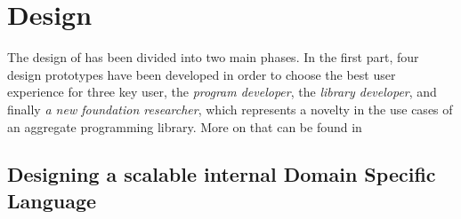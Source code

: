 \chapter{Design}
\label{chap:design}
The design of \this has been divided into two main phases.
%
In the first part, four design prototypes have been developed in order to choose the best user experience for three key user, the \textit{program developer}, the \textit{library developer}, and finally \textit{a new foundation researcher}, which represents a novelty in the use cases of an aggregate programming library.
%
More on that can be found in 

\section{Designing a scalable internal Domain Specific Language} \label{chap:design->sec:dsl}
